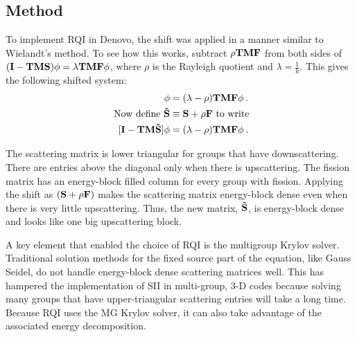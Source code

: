 \subsection{Method}
To implement RQI in Denovo, the shift was applied in a manner similar to Wielandt's method. To see how this works, subtract $\rho \mathbf{TMF}$ from both sides of $(\mathbf{I} - \mathbf{TMS})\phi = \lambda \mathbf{TMF}\phi$, where $\rho$ is the Rayleigh quotient and $\lambda = \frac{1}{k}$. This gives the following shifted system:
%
\begin{align}
  [\ve{I} - \ve{TM}(\ve{S} + \rho\ve{F})]\phi &=( \lambda - \rho) \ve{TMF} \phi \:. \\
  \text{ Now define } \ve{\tilde{S}} &\equiv \ve{S} + \rho\ve{F} \text{ to write} \nonumber \\
   [\ve{I} - \ve{TM\tilde{S}}]\phi &=( \lambda - \rho) \ve{TMF} \phi \:.
    \label{eq:OperatorShiftedEval}
\end{align}

The scattering matrix is lower triangular for groups that have downscattering. There are entries above the diagonal only when there is upscattering. The fission matrix has an energy-block filled column for every group with fission. Applying the shift as $(\mathbf{S} + \rho \mathbf{F})$ makes the scattering matrix energy-block dense even when there is very little upscattering. Thus, the new matrix, $\mathbf{\tilde{S}}$, is energy-block dense and looks like one big upscattering block.

A key element that enabled the choice of RQI is the multigroup Krylov solver. Traditional solution methods for the fixed source part of the equation, like Gauss Seidel, do not handle energy-block dense scattering matrices well. This has hampered the implementation of SII in multi-group, 3-D codes because solving many groups that have upper-triangular scattering entries will take a long time. Because RQI uses the MG Krylov solver, it can also take advantage of the associated energy decomposition. 


